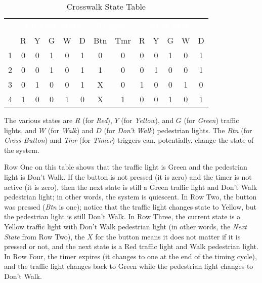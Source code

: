 \begin{table}[H]
  \sffamily
  \newcommand{\head}[1]{\textcolor{white}{\textbf{#1}}}    
  \begin{center}
    \begin{tabular}{ccccccccccccc} 
      \rowcolor{black!75}
      & \multicolumn{5}{c}{\head{Current State}} & \multicolumn{2}{c}{\head{Trigger}} & \multicolumn{5}{c}{\head{Next State}} \\
      & R & Y & G & W & D & Btn & Tmr & R & Y & G & W & D \\
      \hline
      1 & 0 & 0 & 1 & 0 & 1 & 0 & 0 & 0 & 0 & 1 & 0 & 1 \\
      2 & 0 & 0 & 1 & 0 & 1 & 1 & 0 & 0 & 1 & 0 & 0 & 1 \\
      3 & 0 & 1 & 0 & 0 & 1 & X & 0 & 1 & 0 & 0 & 1 & 0 \\
      4 & 1 & 0 & 0 & 1 & 0 & X & 1 & 0 & 0 & 1 & 0 & 1
    \end{tabular}
  \end{center}
  \caption{Crosswalk State Table}
  \label{SIM:tab:crosswalk_state_table}
\end{table}

The various states are $ R $ (for \emph{Red}), $ Y $ (for \emph{Yellow}), and $ G $ (for \emph{Green}) traffic lights, and $ W $ (for \emph{Walk}) and $ D $ (for \emph{Don't Walk}) pedestrian lights. The \emph{Btn} (for \emph{Cross Button}) and \emph{Tmr} (for \emph{Timer}) triggers can, potentially, change the state of the system. 

Row One on this table shows that the traffic light is Green and the pedestrian light is Don't Walk. If the button is not pressed (it is zero) and the timer is not active (it is zero), then the next state is still a Green traffic light and Don't Walk pedestrian light; in other words, the system is quiescent. In Row Two, the button was pressed (\emph{Btn} is one); notice that the traffic light changes state to Yellow, but the pedestrian light is still Don't Walk. In Row Three, the current state is a Yellow traffic light with Don't Walk pedestrian light (in other words, the \emph{Next State} from Row Two), the $ X $ for the button means it does not matter if it is pressed or not, and the next state is a Red traffic light and Walk pedestrian light. In Row Four, the timer expires (it changes to one at the end of the timing cycle), and the traffic light changes back to Green while the pedestrian light changes to Don't Walk. 

